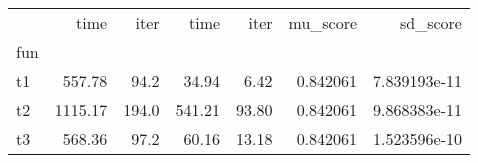 \begin{tabular}{lrrrrrr}
\toprule
{} &     time &   iter &    time &   iter &  mu\_score &      sd\_score \\
fun &          &        &         &        &           &               \\
\midrule
t1  &   557.78 &   94.2 &   34.94 &   6.42 &  0.842061 &  7.839193e-11 \\
t2  &  1115.17 &  194.0 &  541.21 &  93.80 &  0.842061 &  9.868383e-11 \\
t3  &   568.36 &   97.2 &   60.16 &  13.18 &  0.842061 &  1.523596e-10 \\
\bottomrule
\end{tabular}
